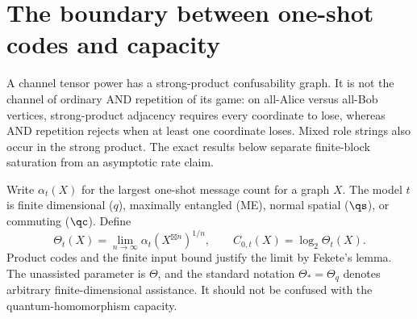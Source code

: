 \section{The boundary between one-shot codes and capacity}\label{sec:capacityboundary}
A channel tensor power has a strong-product confusability graph. It is
not the channel of ordinary AND repetition of its game: on all-Alice
versus all-Bob vertices, strong-product adjacency requires every
coordinate to lose, whereas AND repetition rejects when at least one
coordinate loses. Mixed role strings also occur in the strong product.
The exact results below separate finite-block saturation from an
asymptotic rate claim.

Write $\alpha_t(X)$ for the largest one-shot message count for a graph $X$.
The model $t$ is finite dimensional ($q$), maximally entangled (ME),
normal spatial ($\qs$), or commuting ($\qc$). Define
\[
 \Theta_t(X)=\lim_{n\to\infty}\alpha_t(X^{\boxtimes n})^{1/n},
 \qquad C_{0,t}(X)=\log_2\Theta_t(X).
\]
Product codes and the finite input bound justify the limit by Fekete's
lemma. The unassisted parameter is $\Theta$, and the standard notation
$\Theta_* =\Theta_q$ denotes arbitrary finite-dimensional assistance.
It should not be confused with the quantum-homomorphism capacity.

